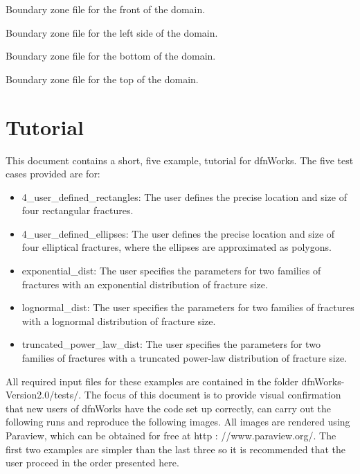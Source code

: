 \documentclass[letterpaper,10pt,english]{sphinxmanual}
\begin{document}
\label{\detokenize{output:pboundary-front-s-zone}}
Boundary zone file for the front of the domain.

\label{\detokenize{output:pboundary-left-w-zone}}
Boundary zone file for the left side of the domain.

\label{\detokenize{output:pboundary-right-e-zone}}
Boundary zone file for the bottom of the domain.

\label{\detokenize{output:pboundary-top-zone}}
Boundary zone file for the top of the domain.


\chapter{Tutorial}
\label{\detokenize{tutorial::doc}}\label{\detokenize{tutorial:tutorial}}
This document contains a short, five example, tutorial for dfnWorks. The five test cases provided are for:
\begin{itemize}
\item {} 
4\_user\_defined\_rectangles: The user defines the precise location and size of four rectangular fractures.

\item {} 
4\_user\_defined\_ellipses: The user defines the precise location and size of four elliptical fractures, where the ellipses are approximated as polygons.

\item {} 
exponential\_dist: The user specifies the parameters for two families of fractures with an exponential distribution of fracture size.

\item {} 
lognormal\_dist: The user specifies the parameters for two families of fractures with a lognormal distribution of fracture size.

\item {} 
truncated\_power\_law\_dist: The user specifies the parameters for two families of fractures with a truncated power-law distribution of fracture size.

\end{itemize}

All required input files for these examples are contained in the folder dfnWorks-Version2.0/tests/. The focus of this document is to provide visual confirmation that new users of dfnWorks have the code set up correctly, can carry out the following runs and reproduce the following images. All images are rendered using Paraview, which can be obtained for free at http : //www.paraview.org/. The first two examples are simpler than the last three so it is recommended that the user proceed in the order presented here.
\end{document}
